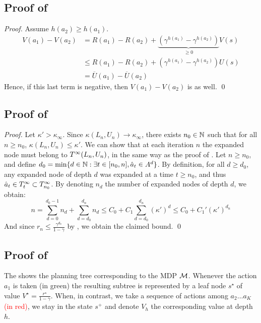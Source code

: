 \documentclass[runningheads]{llncs}
\begin{document}
\subsection{Proof of }

\begin{proof}
Assume $h(a_2) \geq h(a_1)$.
\begin{align*}
    V(a_1) - V(a_2) &= R(a_1)- R(a_2) + \underbrace{\left(\gamma^{h(a_1)} - \gamma^{h(a_2)}\right)}_{\geq 0}V(s) \\
    &\leq R(a_1)- R(a_2) + \left(\gamma^{h(a_1)} - \gamma^{h(a_2)}\right)U(s)\\
    &= \overline{U}(a_1) - \overline{U}(a_2)
\end{align*}
Hence, if this last term is negative, then $V(a_1) - V(a_2)$ is as well.
\qed\end{proof}

\subsection{Proof of }

\begin{proof}
Let $\kappa'>\kappa_\infty$. Since $\kappa(L_n,U_n)\rightarrow\kappa_\infty$, there exists $n_0\in\mathbb{N}$ such that for all $n\geq n_0$, $\kappa(L_n,U_n) \leq \kappa'$.
We can show that at each iteration $n$ the expanded node must belong to $T^\infty(L_n,U_n)$, in the same way as the proof of .
Let $n\geq n_0$, and define $d_0 = \min\{d\in\mathbb{N}: \exists t \in[n_0,n], \hat{a}_t\in A^d \}$. By definition, for all $d\geq d_0$, any expanded node of depth $d$ was expanded at a time $t\geq n_0$, and thus $\hat{a}_t\in T^\infty_t \subset T^\infty_{n_0}$. By denoting $n_d$ the number of expanded nodes of depth $d$, we obtain:
\[
n = \sum_{d=0}^{d_0-1}n_d + \sum_{d=d_0}^{d_n} n_d \leq  C_0 + C_1\sum_{d=d_0}^{d_n} (\kappa')^d \leq C_0 + C_1' (\kappa')^{d_n}
\]
And since $r_n \leq \frac{\gamma^{d_n}}{1-\gamma}$ by , we obtain the claimed bound.
\qed\end{proof}

\subsection{Proof of }

The  shows the planning tree corresponding to the MDP $\mathcal{M}$. Whenever the action $a_1$ is taken \textcolor{OliveGreen}{(in green)} the resulting subtree is represented by a leaf node $s^\star$ of value $V^\star = \frac{r^\star}{1-\gamma}$. When, in contrast, we take a sequence of actions among $a_2\dots a_K$ \textcolor{red}{(in red)}, we stay in the state $s^+$ and denote $V_h$ the corresponding value at depth $h$.
\end{document}
